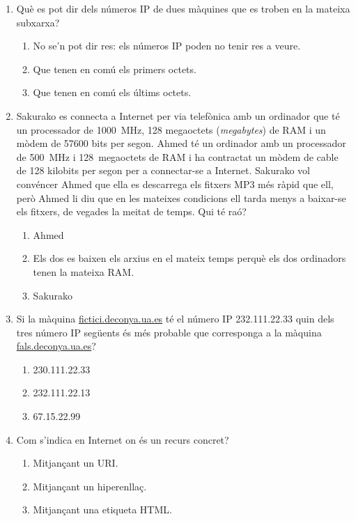 \begin{enumerate}
\item Què es pot dir dels números IP de dues màquines que es troben en
  la mateixa subxarxa?
  \begin{enumerate}
  \item No se'n pot dir res: els números IP poden no tenir res a
    veure.
  \item Que tenen en comú els primers octets.
  \item Que tenen en comú els últims octets.
  \end{enumerate}

\item Sakurako es connecta a Internet per via telefònica amb un
  ordinador que té un processador de 1000~MHz, 128 megaoctets
  (\emph{megabytes}) de RAM i un mòdem de 57600 bits per segon.  Ahmed
  té un ordinador amb un processador de 500~MHz i 128~megaoctets de
  RAM i ha contractat un mòdem de cable de 128 kilobits per segon per
  a connectar-se a Internet. Sakurako vol convéncer Ahmed que ella es
  descarrega els fitxers MP3 més ràpid que ell, però Ahmed li diu que
  en les mateixes condicions ell tarda menys a baixar-se els fitxers,
  de vegades la meitat de temps.  Qui té raó?
  \begin{enumerate}
  \item Ahmed
  \item Els dos es baixen els arxius en el mateix temps perquè els dos
    ordinadors tenen la mateixa RAM.
  \item Sakurako
  \end{enumerate}

\item Si la màquina \url{fictici.deconya.ua.es} té el número IP
  232.111.22.33 quin dels tres número IP següents és més probable que
  corresponga a la màquina \url{fals.deconya.ua.es}?
  \begin{enumerate}
  \item 230.111.22.33
  \item 232.111.22.13
  \item 67.15.22.99
  \end{enumerate}

\item Com s'indica en Internet on és un recurs concret?
  \begin{enumerate}
  \item Mitjançant un URI.
  \item Mitjançant un hiperenllaç.
  \item Mitjançant una etiqueta HTML.
\end{enumerate}


\end{enumerate}
